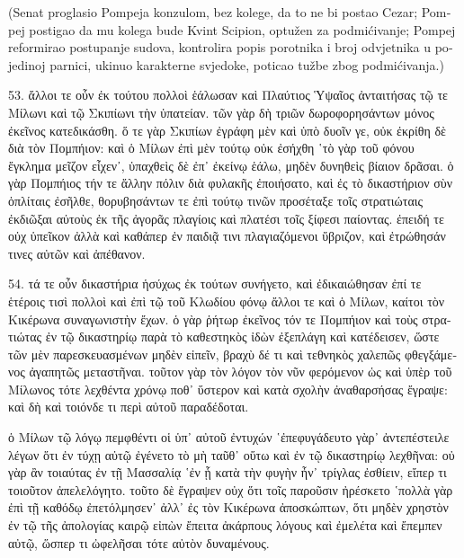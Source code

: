 \begin{greek}
\end{greek}

\bigskip


\begin{croatian}

(Senat proglasio Pompeja konzulom, bez kolege, da to ne bi postao Cezar; Pompej postigao da mu kolega bude Kvint Scipion, optužen za podmićivanje; Pompej reformirao postupanje sudova, kontrolira popis porotnika i broj odvjetnika u pojedinoj parnici, ukinuo karakterne svjedoke, poticao tužbe zbog podmićivanja.)

\end{croatian}

\bigskip

\begin{greek}

53. ἄλλοι τε οὖν ἐκ τούτου πολλοὶ ἑάλωσαν καὶ Πλαύτιος Ὑψαῖος ἀνταιτήσας τῷ τε Μίλωνι καὶ τῷ Σκιπίωνι τὴν ὑπατείαν. τῶν γὰρ δὴ τριῶν δωροφορησάντων μόνος ἐκεῖνος κατεδικάσθη. ὅ τε γὰρ Σκιπίων ἐγράφη μὲν καὶ ὑπὸ δυοῖν γε, οὐκ ἐκρίθη δὲ διὰ τὸν Πομπήιον: καὶ ὁ Μίλων ἐπὶ μὲν τούτῳ οὐκ ἐσήχθη ῾τὸ γὰρ τοῦ φόνου ἔγκλημα μεῖζον εἶχεν᾽, ὑπαχθεὶς δὲ ἐπ᾽ ἐκείνῳ ἑάλω, μηδὲν δυνηθεὶς βίαιον δρᾶσαι. ὁ γὰρ Πομπήιος τήν τε ἄλλην πόλιν διὰ φυλακῆς ἐποιήσατο, καὶ ἐς τὸ δικαστήριον σὺν ὁπλίταις ἐσῆλθε, θορυβησάντων τε ἐπὶ τούτῳ τινῶν προσέταξε τοῖς στρατιώταις ἐκδιῶξαι αὐτοὺς ἐκ τῆς ἀγορᾶς πλαγίοις καὶ πλατέσι τοῖς ξίφεσι παίοντας. ἐπειδή τε οὐχ ὑπεῖκον ἀλλὰ καὶ καθάπερ ἐν παιδιᾷ τινι πλαγιαζόμενοι ὕβριζον, καὶ ἐτρώθησάν τινες αὐτῶν καὶ ἀπέθανον. 

54. τά τε οὖν δικαστήρια ἡσύχως ἐκ τούτων συνήγετο, καὶ ἐδικαιώθησαν ἐπί τε ἑτέροις τισὶ πολλοὶ καὶ ἐπὶ τῷ τοῦ Κλωδίου φόνῳ ἄλλοι τε καὶ ὁ Μίλων, καίτοι τὸν Κικέρωνα συναγωνιστὴν ἔχων. ὁ γὰρ ῥήτωρ ἐκεῖνος τόν τε Πομπήιον καὶ τοὺς στρατιώτας ἐν τῷ δικαστηρίῳ παρὰ τὸ καθεστηκὸς ἰδὼν ἐξεπλάγη καὶ κατέδεισεν, ὥστε τῶν μὲν παρεσκευασμένων μηδὲν εἰπεῖν, βραχὺ δέ τι καὶ τεθνηκὸς χαλεπῶς φθεγξάμενος ἀγαπητῶς μεταστῆναι. τοῦτον γὰρ τὸν λόγον τὸν νῦν φερόμενον ὡς καὶ ὑπὲρ τοῦ Μίλωνος τότε λεχθέντα χρόνῳ ποθ᾽ ὕστερον καὶ κατὰ σχολὴν ἀναθαρσήσας ἔγραψε: καὶ δὴ καὶ τοιόνδε τι περὶ αὐτοῦ παραδέδοται. 

ὁ Μίλων τῷ λόγῳ πεμφθέντι οἱ ὑπ᾽ αὐτοῦ ἐντυχών ῾ἐπεφυγάδευτο γὰρ᾽ ἀντεπέστειλε λέγων ὅτι ἐν τύχῃ αὐτῷ ἐγένετο τὸ μὴ ταῦθ᾽ οὕτω καὶ ἐν τῷ δικαστηρίῳ λεχθῆναι: οὐ γὰρ ἂν τοιαύτας ἐν τῇ Μασσαλίᾳ ῾ἐν ᾗ κατὰ τὴν φυγὴν ἦν᾽ τρίγλας ἐσθίειν, εἴπερ τι τοιοῦτον ἀπελελόγητο. τοῦτο δὲ ἔγραψεν οὐχ ὅτι τοῖς παροῦσιν ἠρέσκετο ῾πολλὰ γὰρ ἐπὶ τῇ καθόδῳ ἐπετόλμησεν᾽ ἀλλ᾽ ἐς τὸν Κικέρωνα ἀποσκώπτων, ὅτι μηδὲν χρηστὸν ἐν τῷ τῆς ἀπολογίας καιρῷ εἰπὼν ἔπειτα ἀκάρπους λόγους καὶ ἐμελέτα καὶ ἔπεμπεν αὐτῷ, ὥσπερ τι ὠφελῆσαι τότε αὐτὸν δυναμένους.



\end{greek}
